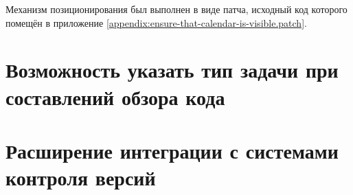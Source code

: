 Механизм позиционирования был выполнен в виде патча, исходный код которого
помещён в приложение \ref{appendix:ensure-that-calendar-is-visible.patch}.

\section{Возможность указать тип задачи при составлений обзора кода}

\section{Расширение интеграции с системами контроля версий}









